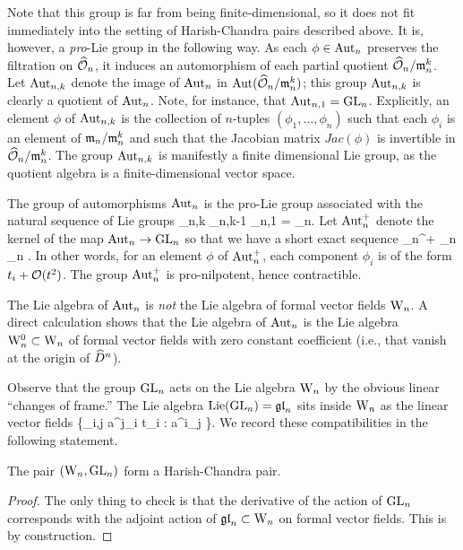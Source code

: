 Note that this group is far from being finite-dimensional, so it does not fit immediately into the setting of Harish-Chandra pairs described above. 
It is, however, a {\em pro}-Lie group in the following way. 
As each $\phi \in {\rm Aut}_n$ preserves the filtration on $\widehat{\mathcal O}_n$, it induces an automorphism of each partial quotient $\widehat{\mathcal O}_n/{\mathfrak m}_n^k$.
Let ${\rm Aut}_{n,k}$ denote the image of ${\rm Aut}_n$ in ${\rm Aut}(\widehat{\mathcal O}_n/{\mathfrak m}_n^k)$; this group ${\rm Aut}_{n,k}$ is clearly a quotient of ${\rm Aut}_n$.
Note, for instance, that ${\rm Aut}_{n,1} = {\rm GL}_n$.
Explicitly, an element $\phi$ of ${\rm Aut}_{n,k}$ is the collection of $n$-tuples $(\phi_1,\ldots,\phi_n)$ 
such that each $\phi_i$ is an element of ${\mathfrak m}_n/{\mathfrak m}_n^k$ and such that the Jacobian matrix $Jac(\phi)$ is invertible in $\widehat{\mathcal O}_n/{\mathfrak m}_n^k$.
The group ${\rm Aut}_{n,k}$ is manifestly a finite dimensional Lie group, as the quotient algebra is a finite-dimensional vector space. 
 
The group of automorphisms ${\rm Aut}_n$ is the pro-Lie group associated with the natural sequence of Lie groups
\ben
\cdots \to \Aut_{n,k} \to \Aut_{n,k-1} \to \cdots \to \Aut_{n,1} = \GL_n.
\een
Let ${\rm Aut}_n^+$ denote the kernel of the map ${\rm Aut}_n \to {\rm GL}_n$ so that we have a short exact sequence
 \to \Aut_n^+ \to \Aut_n \to \GL_n  .
\een
In other words, for an element $\phi$ of ${\rm Aut}_n^+$, each component
$\phi_i$ is of the form $t_i + \mathcal O(t^2)$. The group ${\rm Aut}_n^+$ is
pro-nilpotent, hence contractible. 

The Lie algebra of ${\rm Aut}_n$ is {\em not} the Lie algebra of formal
vector fields ${{\rm W}_n}$. A direct
calculation shows that the Lie algebra of ${\rm Aut}_n$ is the Lie algebra ${{\rm W}^0_n} \subset {{\rm W}_n}$ of formal vector fields with zero constant coefficient (i.e., that vanish at the origin of $\widehat{D}^n$). 

Observe that the group ${\rm GL}_n$ acts on the Lie algebra ${{\rm W}_n}$ by the obvious linear ``changes of frame.''
The Lie algebra ${\rm Lie}({{\rm GL}_n}) = {\mathfrak{gl}}_n$ sits inside ${{\rm W}_n}$ as the linear vector fields
\ben
\left\{\sum_{i,j} a^j_i t_i  \; : \; a^{i}_j \in \CC \right\}.
\een 
We record these compatibilities in the following statement.

\begin{lem} 
The pair $({{\rm W}_n}, {\rm GL}_n)$ form a Harish-Chandra pair.
\end{lem}
\begin{proof} The only thing to check is that the derivative of the
  action of ${\rm GL}_n$ corresponds with the adjoint action of ${\mathfrak{gl}}_n
  \subset {{\rm W}_n}$ on formal vector fields. This is by construction. 
\end{proof}

